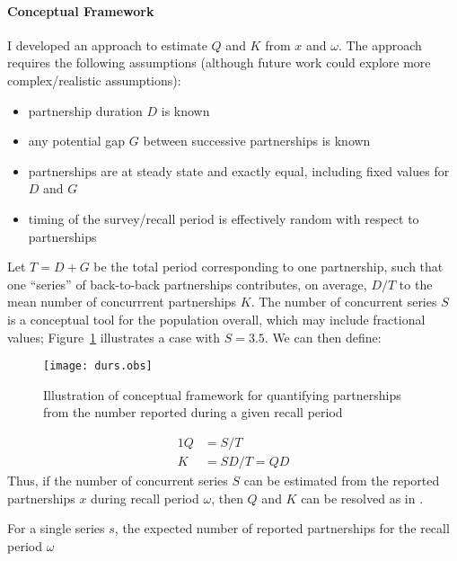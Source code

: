 \paragraph{Conceptual Framework}
I developed an approach to estimate $Q$ and $K$ from $x$ and $\omega$.
The approach requires the following assumptions
(although future work could explore more complex/realistic assumptions):
\begin{itemize}
  \item partnership duration $D$ is known
  \item any potential gap $G$ between successive partnerships is known
  \item partnerships are at steady state and exactly equal, including fixed values for $D$ and $G$
  \item timing of the survey/recall period is effectively random with respect to partnerships
\end{itemize}
Let $T = D + G$ be the total period corresponding to one partnership,
such that one ``series'' of back-to-back partnerships contributes, on average,
$D/T$ to the mean number of concurrrent partnerships $K$.
The number of concurrent series $S$ is a conceptual tool for the population overall,
which may include fractional values;
\eg Figure~\ref{fig:durs.obs} illustrates a case with $S = 3.5$.
We can then define:
\begin{figure}
  \centering
  \texttt{[image: durs.obs]}
  \caption{Illustration of conceptual framework for quantifying partnerships
    from the number reported during a given recall period}
  \label{fig:durs.obs}
\end{figure}
\begin{alignat}{1}
  Q &= S / T        \label{eq:Q.dur}\\
  K &= S D / T = QD \label{eq:K.dur}
\end{alignat}
Thus, if the number of concurrent series $S$ can be estimated from
the reported partnerships $x$ during recall period $\omega$,
then $Q$ and $K$ can be resolved as in .
\par
For a single series $s$, the expected number of reported partnerships for the recall period $\omega$
